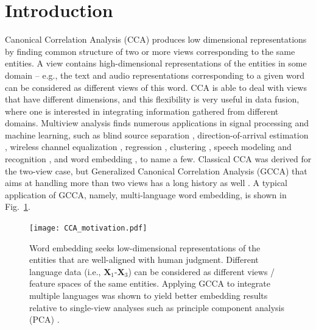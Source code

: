 \documentclass[10pt,journal]{IEEEtran}
\newcommand{\X}{\boldsymbol{X}}
\begin{document}
\section{Introduction}
Canonical Correlation Analysis (CCA) \cite{hardoon2004canonical} produces low dimensional representations by finding common structure of two or more views corresponding to the same entities.
A view contains high-dimensional representations of the entities in some domain -- e.g., the text and audio representations corresponding to a given word can be considered as different views of this word.
CCA is able to deal with views that have different dimensions, and this flexibility is very useful in data fusion, where one is interested in integrating information gathered from different domains.
Multiview analysis finds numerous applications in signal processing and machine learning, such as 
blind source separation \cite{li2009joint,bertrand2015distributed}, direction-of-arrival estimation \cite{wu1994music}, wireless channel equalization \cite{dogandzic2002finite}, regression \cite{kakade2007multi}, clustering \cite{chaudhuri2009multi}, speech modeling and recognition \cite{arora2014multi,wang2015acoustic}, and word embedding \cite{rastogimultiview}, to name a few.
Classical CCA was derived for the two-view case, but Generalized Canonical Correlation Analysis (GCCA) that aims at handling more than two views has a long history as well \cite{carroll1968generalization}. 
A typical application of GCCA, namely, multi-language word embedding, is shown in  Fig.~\ref{fig:motivation}.


\begin{figure}[t]
\centering
{\texttt{[image: CCA\_motivation.pdf]}
\caption{Word embedding seeks low-dimensional representations of the entities that are well-aligned with human judgment. Different language data (i.e., ${\bm X}_1$-$\X_3$) can be considered as different views / feature spaces of the same entities. Applying GCCA to integrate multiple languages was shown to yield better embedding results relative to single-view analyses such as principle component analysis (PCA) \cite{rastogimultiview}.
}
\label{fig:motivation}}
\end{figure}
\end{document}
